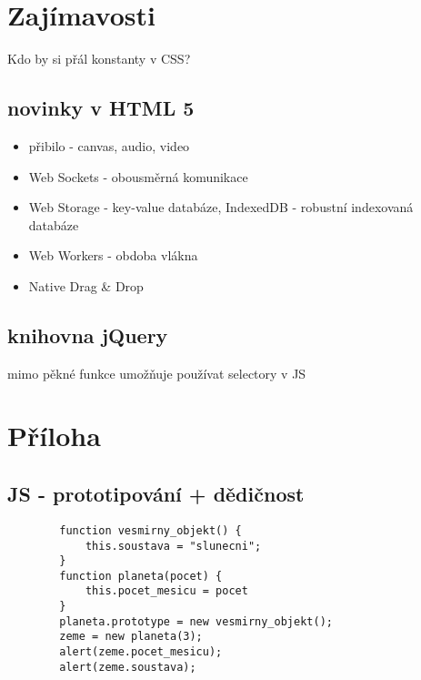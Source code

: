 \documentclass{scrreprt}
\begin{document}
\section{Zajímavosti}
Kdo by si přál konstanty v CSS?

\subsection{novinky v HTML 5}
\begin{itemize}
  \item přibilo - canvas, audio, video
  \item Web Sockets - obousměrná komunikace 
  \item Web Storage - key-value databáze, IndexedDB - robustní indexovaná databáze
  \item Web Workers - obdoba vlákna
  \item Native Drag \& Drop
\end{itemize}

\subsection{knihovna jQuery}
mimo pěkné funkce umožňuje používat selectory v JS

\section{Příloha}
\subsection{JS - prototipování + dědičnost}
\begin{verbatim}
		function vesmirny_objekt() {
			this.soustava = "slunecni";
		}
		function planeta(pocet) {
			this.pocet_mesicu = pocet
		}
		planeta.prototype = new vesmirny_objekt();
		zeme = new planeta(3);
		alert(zeme.pocet_mesicu);
		alert(zeme.soustava);
\end{verbatim}
\end{document}
